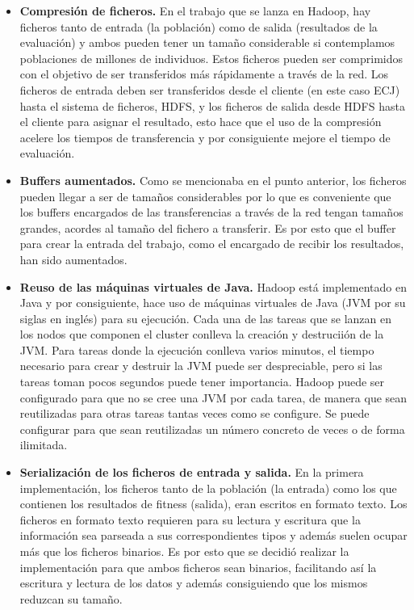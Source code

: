 \begin{itemize}
	\item \textbf{Compresi\'on de ficheros.} En el trabajo que se lanza en Hadoop, hay ficheros tanto de entrada (la población) como de salida (resultados de la evaluación) y ambos pueden tener un tamaño considerable si contemplamos poblaciones de millones de individuos. Estos ficheros pueden ser comprimidos con el objetivo de ser transferidos m\'as rápidamente a trav\'es de la red. Los ficheros de entrada deben ser transferidos desde el cliente (en este caso ECJ) hasta el sistema de ficheros, HDFS, y los ficheros de salida desde HDFS hasta el cliente para asignar el resultado, esto hace que el uso de la compresión acelere los tiempos de transferencia y por consiguiente mejore el tiempo de evaluación.
	\item \textbf{Buffers aumentados.} Como se mencionaba en el punto anterior, los ficheros pueden llegar a ser de tamaños considerables por lo que es conveniente que los buffers encargados de las transferencias a través de la red tengan tamaños grandes, acordes al tamaño del fichero a transferir. Es por esto que el buffer para crear la entrada del trabajo, como el encargado de recibir los resultados, han sido aumentados.
	\item \textbf{Reuso de las m\'aquinas virtuales de Java.} Hadoop est\'a implementado en Java y por consiguiente, hace uso de m\'aquinas virtuales de Java (JVM por su siglas en ingl\'es) para su ejecuci\'on. Cada una de las tareas que se lanzan en los nodos que componen el cluster conlleva la creaci\'on y destrucii\'on de la JVM. Para tareas donde la ejecuci\'on conlleva varios minutos, el tiempo necesario para crear y destruir la JVM puede ser despreciable, pero si las tareas toman pocos segundos puede tener importancia. Hadoop puede ser configurado para que no se cree una JVM por cada tarea, de manera que sean reutilizadas para otras tareas tantas veces como se configure. Se puede configurar para que sean reutilizadas un n\'umero concreto de veces o de forma ilimitada.
	\item \textbf{Serializaci\'on de los ficheros de entrada y salida.} En la primera implementación, los ficheros tanto de la población (la entrada) como los que contienen los resultados de fitness (salida), eran escritos en formato texto. Los ficheros en formato texto requieren para su lectura y escritura que la información sea parseada a sus correspondientes tipos y adem\'as suelen ocupar m\'as que los ficheros binarios. Es por esto que se decidió realizar la implementación para que ambos ficheros sean binarios, facilitando así la escritura y lectura de los datos y adem\'as consiguiendo que los mismos reduzcan su tamaño.
\end{itemize}













